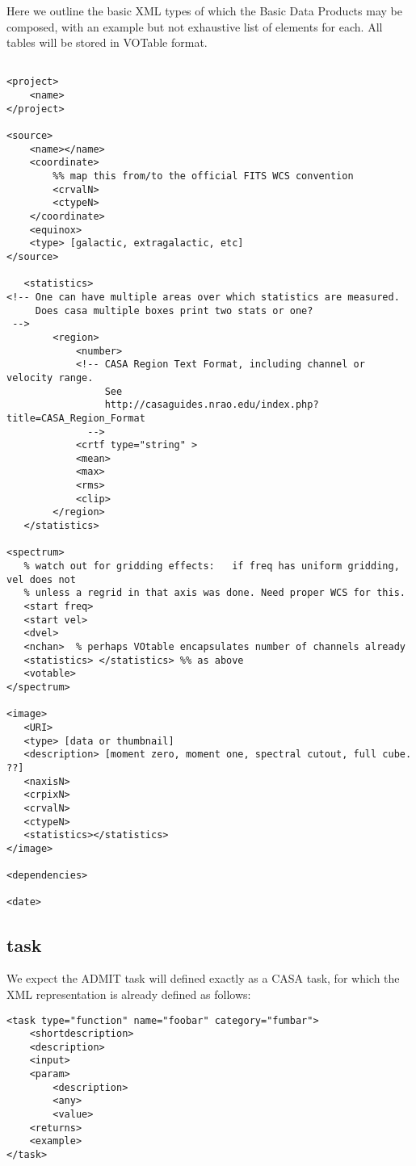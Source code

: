 \documentclass{article}
\begin{document}
Here we outline the basic XML types of which the Basic Data Products
may be composed, with an example but not exhaustive list of elements for each.
All tables will be stored in VOTable format.
\begin{verbatim}

<project>
    <name>
</project>

<source>
    <name></name>
    <coordinate>
        %% map this from/to the official FITS WCS convention
        <crvalN>
        <ctypeN>
    </coordinate>
    <equinox>
    <type> [galactic, extragalactic, etc]
</source>

   <statistics>
<!-- One can have multiple areas over which statistics are measured.
     Does casa multiple boxes print two stats or one?
 -->
        <region>
            <number>
            <!-- CASA Region Text Format, including channel or velocity range. 
                 See 
                 http://casaguides.nrao.edu/index.php?title=CASA_Region_Format
              -->
            <crtf type="string" >
            <mean>
            <max>
            <rms>
            <clip>
        </region>
   </statistics>

<spectrum>
   % watch out for gridding effects:   if freq has uniform gridding, vel does not
   % unless a regrid in that axis was done. Need proper WCS for this.
   <start freq>
   <start vel>
   <dvel>
   <nchan>  % perhaps VOtable encapsulates number of channels already
   <statistics> </statistics> %% as above
   <votable>
</spectrum>

<image>
   <URI>
   <type> [data or thumbnail]
   <description> [moment zero, moment one, spectral cutout, full cube. ??] 
   <naxisN>
   <crpixN>
   <crvalN>
   <ctypeN>
   <statistics></statistics>
</image>

<dependencies>

<date>

\end{verbatim}

\subsection{task}
We expect the ADMIT task will defined exactly as a CASA task, for which the XML
representation is already defined as follows:

\begin{verbatim}
<task type="function" name="foobar" category="fumbar">
    <shortdescription>
    <description>
    <input>
    <param>
        <description>
        <any>
        <value>
    <returns>
    <example>
</task>  

\end{verbatim}
\end{document}
